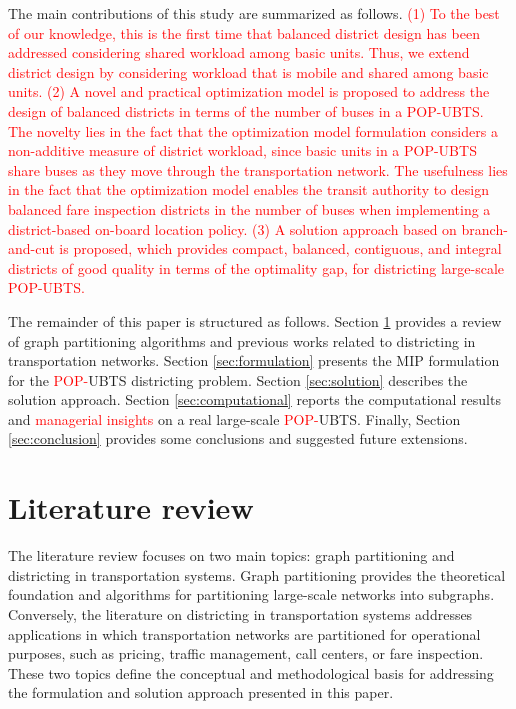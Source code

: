 \documentclass[preprint,11pt]{elsarticle}
\begin{document}
The main contributions of this study are summarized as follows.
\textcolor{red}{(1) To the best of our knowledge, this is the first time that balanced district design has been addressed considering shared workload among basic units. Thus, we extend district design by considering workload that is mobile and shared among basic units.
(2) A novel and practical optimization model is proposed to address the design of balanced districts in terms of the number of buses in a POP-UBTS. The novelty lies in the fact that the optimization model formulation considers a non-additive measure of district workload, since basic units in a POP-UBTS share buses as they move through the transportation network. 
The usefulness lies in the fact that the optimization model enables the transit authority to design balanced fare inspection districts in the number of buses when implementing a district-based on-board location policy.
(3) A solution approach based on branch-and-cut is proposed, which provides compact, balanced, contiguous, and integral districts of good quality in terms of the optimality gap, for districting large-scale POP-UBTS.} 

The remainder of this paper is structured as follows. Section \ref{sec:literature} provides a review of graph partitioning algorithms and previous works related to districting in transportation networks. 
Section \ref{sec:formulation} presents the MIP formulation for the \textcolor{red}{POP-}UBTS districting problem.
Section \ref{sec:solution} describes the solution approach. 
Section \ref{sec:computational} reports the computational results and \textcolor{red}{managerial insights} on a real large-scale \textcolor{red}{POP-}UBTS.
Finally, Section \ref{sec:conclusion} provides some conclusions and suggested future extensions.

\section{Literature review} \label{sec:literature}
The literature review focuses on two main topics: graph partitioning and districting in transportation systems. 
Graph partitioning provides the theoretical foundation and algorithms for partitioning large-scale networks into subgraphs.
Conversely, the literature on districting in transportation systems addresses applications in which transportation networks are partitioned for operational purposes, such as pricing, traffic management, call centers, or fare inspection. 
These two topics define the conceptual and methodological basis for addressing the formulation and solution approach presented in this paper.
\end{document}
